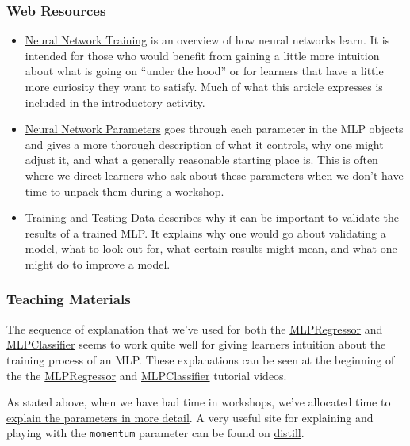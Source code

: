 \documentclass{article}
\providecommand{\tightlist}{%
  \setlength{\itemsep}{0pt}\setlength{\parskip}{0pt}}
\begin{document}
\subsubsection{Web Resources}

\begin{itemize}
\tightlist
\item
  \href{https://learn.flucoma.org/learn/mlp-training/}{Neural Network
  Training} is an overview of how neural networks learn. It is intended
  for those who would benefit from gaining a little more intuition about
  what is going on ``under the hood'' or for learners that have a little
  more curiosity they want to satisfy. Much of what this article expresses is included in the introductory activity.
\item
  \href{https://learn.flucoma.org/learn/mlp-parameters/}{Neural Network
  Parameters} goes through each parameter in the MLP objects and gives a
  more thorough description of what it controls, why one might adjust
  it, and what a generally reasonable starting place is. This is often
  where we direct learners who ask about these parameters when we don't
  have time to unpack them during a workshop.
\item
  \href{https://learn.flucoma.org/learn/training-testing-split/}{Training
  and Testing Data} describes why it can be important to validate the
  results of a trained MLP. It explains why one would go about
  validating a model, what to look out for, what certain results might
  mean, and what one might do to improve a model.
\end{itemize}

\subsubsection{Teaching Materials}

The sequence of explanation that we've used for both the
\href{https://f003.backblazeb2.com/file/learnassets/examples/teaching-material/regressor-process.pdf}{MLPRegressor}
and
\href{https://f003.backblazeb2.com/file/learnassets/examples/teaching-material/classifier-process.pdf}{MLPClassifier}
seems to work quite well for giving learners intuition about the
training process of an MLP. These explanations can be seen at the
beginning of the the
\href{https://learn.flucoma.org/learn/regression-neural-network/}{MLPRegressor}
and
\href{https://learn.flucoma.org/learn/classification-neural-network/}{MLPClassifier}
tutorial videos.

As stated above, when we have had time in workshops, we've allocated
time to
\href{https://f003.backblazeb2.com/file/learnassets/examples/teaching-material/mlp-parameters.pdf}{explain
the parameters in more detail}. A very useful site for explaining and
playing with the \texttt{momentum} parameter can be found on
\href{https://distill.pub/2017/momentum/}{distill}.
\end{document}
